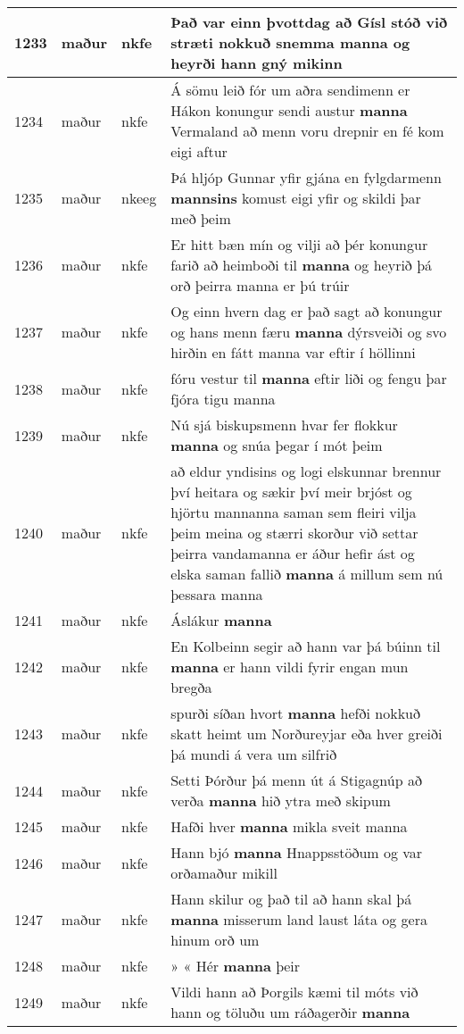 \documentclass{article}
\begin{document}
\begin{longtable}{p{1cm}|p{1cm}|p{1cm}|p{13cm}}
\hline
1233&maður&nkfe&Það var einn þvottdag að Gísl stóð við stræti nokkuð snemma \textbf{manna} og heyrði hann gný mikinn\\
\hline
1234&maður&nkfe&Á sömu leið fór um aðra sendimenn er Hákon konungur sendi austur \textbf{manna} Vermaland að menn voru drepnir en fé kom eigi aftur\\
\hline
1235&maður&nkeeg&Þá hljóp Gunnar yfir gjána en fylgdarmenn \textbf{mannsins} komust eigi yfir og skildi þar með þeim\\
\hline
1236&maður&nkfe&Er hitt bæn mín og vilji að þér konungur farið að heimboði til \textbf{manna} og heyrið þá orð þeirra manna er þú trúir\\
\hline
1237&maður&nkfe&Og einn hvern dag er það sagt að konungur og hans menn færu \textbf{manna} dýrsveiði og svo hirðin en fátt manna var eftir í höllinni\\
\hline
1238&maður&nkfe&fóru vestur til \textbf{manna} eftir liði og fengu þar fjóra tigu manna\\
\hline
1239&maður&nkfe&Nú sjá biskupsmenn hvar fer flokkur \textbf{manna} og snúa þegar í mót þeim\\
\hline
1240&maður&nkfe&að eldur yndisins og logi elskunnar brennur því heitara og sækir því meir brjóst og hjörtu mannanna saman sem fleiri vilja þeim meina og stærri skorður við settar þeirra vandamanna er áður hefir ást og elska saman fallið \textbf{manna} á millum sem nú þessara manna\\
\hline
1241&maður&nkfe&Áslákur \textbf{manna} \\
\hline
1242&maður&nkfe&En Kolbeinn segir að hann var þá búinn til \textbf{manna} er hann vildi fyrir engan mun bregða\\
\hline
1243&maður&nkfe&spurði síðan hvort \textbf{manna} hefði nokkuð skatt heimt um Norðureyjar eða hver greiði þá mundi á vera um silfrið\\
\hline
1244&maður&nkfe&Setti Þórður þá menn út á Stigagnúp að verða \textbf{manna} hið ytra með skipum\\
\hline
1245&maður&nkfe&Hafði hver \textbf{manna} mikla sveit manna\\
\hline
1246&maður&nkfe&Hann bjó \textbf{manna} Hnappsstöðum og var orðamaður mikill\\
\hline
1247&maður&nkfe&Hann skilur og það til að hann skal þá \textbf{manna} misserum land laust láta og gera hinum orð um\\
\hline
1248&maður&nkfe&» « Hér \textbf{manna} þeir\\
\hline
1249&maður&nkfe&Vildi hann að Þorgils kæmi til móts við hann og töluðu um ráðagerðir \textbf{manna} \\

\end{longtable}
\end{document}
